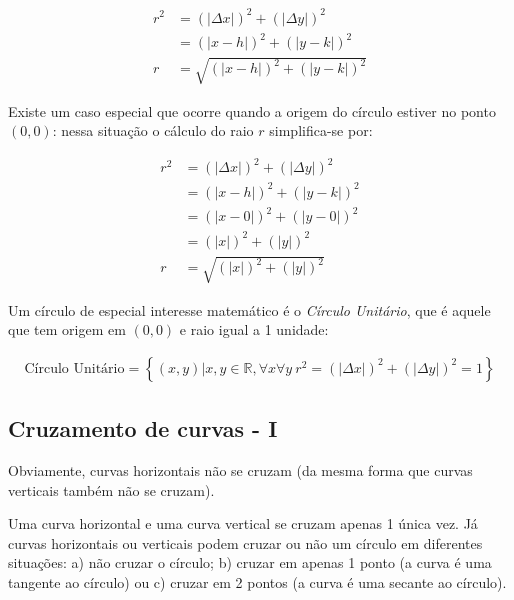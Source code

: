 \documentclass[pdftex, brazil, 12pt, twoside]{article}
\begin{document}
\begin{equation}
  \begin{split}
    r^2 & = (|\Delta x|)^2 + (|\Delta y|)^2\\
        & = (|x - h|)^2 + (|y - k|)^2\\
      r & = \sqrt{(|x - h|)^2 + (|y - k|)^2}
  \end{split}
\end{equation}

Existe um caso especial que ocorre quando a origem do círculo estiver no ponto $(0, 0)$: nessa
situação o cálculo do raio $r$ simplifica-se por:

\begin{equation}
  \begin{split}
    r^2 & = (|\Delta x|)^2 + (|\Delta y|)^2\\
        & = (|x - h|)^2 + (|y - k|)^2\\
        & = (|x - 0|)^2 + (|y - 0|)^2\\
        & = (|x|)^2 + (|y|)^2\\
      r & = \sqrt{(|x|)^2 + (|y|)^2}
  \end{split}
\end{equation}

Um círculo de especial interesse matemático é o \emph{Círculo Unitário}, que é aquele
que tem origem em $(0, 0)$ e raio igual a 1 unidade:

\begin{equation}
  \begin{split}
    \text{Círculo Unitário} = \left\{(x, y) | x,y \in \mathbb{R}, \forall x \forall y\ r^2 = (|\Delta x|)^2 + (|\Delta y|)^2 = 1\right\}
  \end{split}
\end{equation}


\subsection{Cruzamento de curvas - I}
\label{tres-curvas-cruzamento-I}

Obviamente, curvas horizontais não se cruzam (da mesma forma que
curvas verticais também não se cruzam).

Uma curva horizontal e uma curva vertical se cruzam apenas 1 única vez.
Já curvas horizontais ou verticais podem cruzar ou não um círculo em diferentes
situações: a) não cruzar o círculo; b) cruzar em apenas 1 ponto (a curva é uma tangente
ao círculo) ou c) cruzar em 2 pontos (a curva é uma secante ao círculo).
\end{document}
